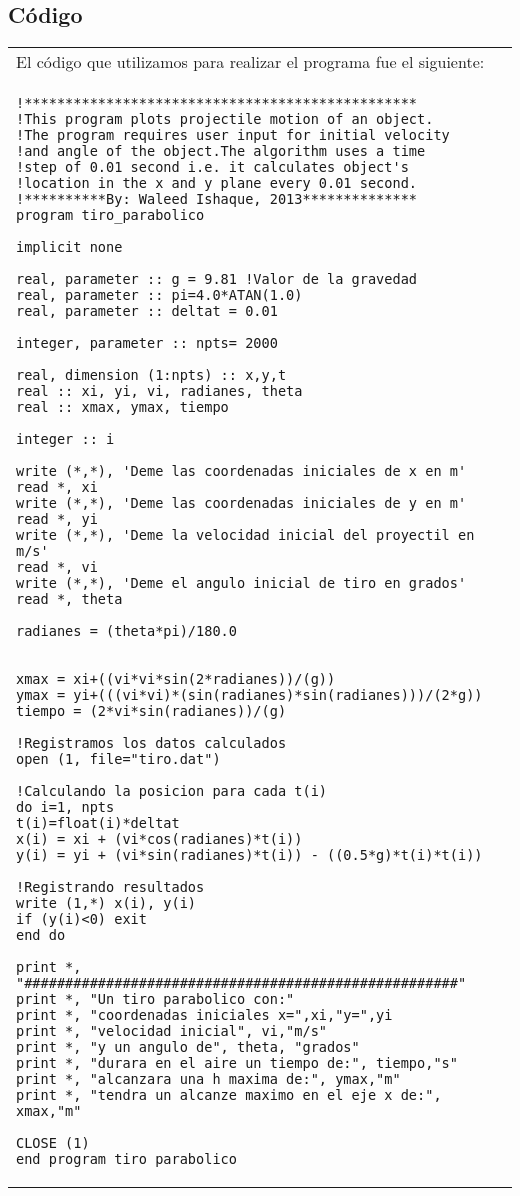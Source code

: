 \documentclass[10pt]{article}
\begin{document}
\subsection{Código}
\begin{tabular}{l}
El código que utilizamos para realizar el programa fue el siguiente:\\
\begin{verbatim}
!************************************************
!This program plots projectile motion of an object.
!The program requires user input for initial velocity
!and angle of the object.The algorithm uses a time
!step of 0.01 second i.e. it calculates object's
!location in the x and y plane every 0.01 second.
!**********By: Waleed Ishaque, 2013**************
program tiro_parabolico

implicit none

real, parameter :: g = 9.81 !Valor de la gravedad
real, parameter :: pi=4.0*ATAN(1.0)
real, parameter :: deltat = 0.01

integer, parameter :: npts= 2000 

real, dimension (1:npts) :: x,y,t
real :: xi, yi, vi, radianes, theta
real :: xmax, ymax, tiempo 

integer :: i

write (*,*), 'Deme las coordenadas iniciales de x en m'
read *, xi
write (*,*), 'Deme las coordenadas iniciales de y en m'
read *, yi
write (*,*), 'Deme la velocidad inicial del proyectil en m/s'
read *, vi
write (*,*), 'Deme el angulo inicial de tiro en grados'
read *, theta

radianes = (theta*pi)/180.0


xmax = xi+((vi*vi*sin(2*radianes))/(g))
ymax = yi+(((vi*vi)*(sin(radianes)*sin(radianes)))/(2*g))
tiempo = (2*vi*sin(radianes))/(g)

!Registramos los datos calculados
open (1, file="tiro.dat")

!Calculando la posicion para cada t(i)
do i=1, npts
t(i)=float(i)*deltat
x(i) = xi + (vi*cos(radianes)*t(i))
y(i) = yi + (vi*sin(radianes)*t(i)) - ((0.5*g)*t(i)*t(i))

!Registrando resultados
write (1,*) x(i), y(i)
if (y(i)<0) exit
end do

print *, "#####################################################"
print *, "Un tiro parabolico con:"
print *, "coordenadas iniciales x=",xi,"y=",yi
print *, "velocidad inicial", vi,"m/s"
print *, "y un angulo de", theta, "grados"
print *, "durara en el aire un tiempo de:", tiempo,"s"
print *, "alcanzara una h maxima de:", ymax,"m"
print *, "tendra un alcanze maximo en el eje x de:", xmax,"m"

CLOSE (1)
end program tiro_parabolico
\end{verbatim} \\
\end{tabular}
\newpage
\end{document}
